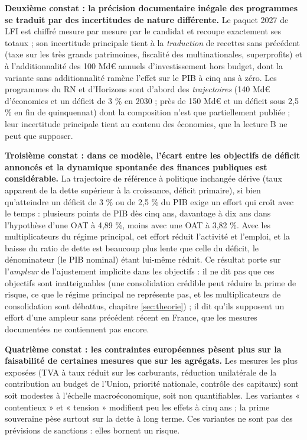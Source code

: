 \documentclass[
  11pt,
  11pt,
  a4paper,
  openany]{book}
\begin{document}
\textbf{Deuxième constat : la précision documentaire inégale des
programmes se traduit par des incertitudes de nature différente.} Le
paquet 2027 de LFI est chiffré mesure par mesure par le candidat et
recoupe exactement ses totaux ; son incertitude principale tient à la
\emph{traduction} de recettes sans précédent (taxe sur les très grands
patrimoines, fiscalité des multinationales, superprofits) et à
l'additionnalité des 100 Md€ annuels d'investissement hors budget, dont
la variante sans additionnalité ramène l'effet sur le PIB à cinq ans à
zéro. Les programmes du RN et d'Horizons sont d'abord des
\emph{trajectoires} (140 Md€ d'économies et un déficit de 3 \% en 2030 ;
près de 150 Md€ et un déficit sous 2,5 \% en fin de quinquennat) dont la
composition n'est que partiellement publiée ; leur incertitude
principale tient au contenu des économies, que la lecture B ne peut que
supposer.

\textbf{Troisième constat : dans ce modèle, l'écart entre les objectifs
de déficit annoncés et la dynamique spontanée des finances publiques est
considérable.} La trajectoire de référence à politique inchangée dérive
(taux apparent de la dette supérieur à la croissance, déficit primaire),
si bien qu'atteindre un déficit de 3 \% ou de 2,5 \% du PIB exige un
effort qui croît avec le temps : plusieurs points de PIB dès cinq ans,
davantage à dix ans dans l'hypothèse d'une OAT à 4,89 \%, moins avec une
OAT à 3,82 \%. Avec les multiplicateurs du régime principal, cet effort
réduit l'activité et l'emploi, et la baisse du ratio de dette est
beaucoup plus lente que celle du déficit, le dénominateur (le PIB
nominal) étant lui-même réduit. Ce résultat porte sur l'\emph{ampleur}
de l'ajustement implicite dans les objectifs : il ne dit pas que ces
objectifs sont inatteignables (une consolidation crédible peut réduire
la prime de risque, ce que le régime principal ne représente pas, et les
multiplicateurs de consolidation sont débattus, chapitre
\ref{sec:theorie}) ; il dit qu'ils supposent un effort d'une ampleur
sans précédent récent en France, que les mesures documentées ne
contiennent pas encore.

\textbf{Quatrième constat : les contraintes européennes pèsent plus sur
la faisabilité de certaines mesures que sur les agrégats.} Les mesures
les plus exposées (TVA à taux réduit sur les carburants, réduction
unilatérale de la contribution au budget de l'Union, priorité nationale,
contrôle des capitaux) sont soit modestes à l'échelle macroéconomique,
soit non quantifiables. Les variantes « contentieux » et « tension »
modifient peu les effets à cinq ans ; la prime souveraine pèse surtout
sur la dette à long terme. Ces variantes ne sont pas des prévisions de
sanctions : elles bornent un risque.
\end{document}

